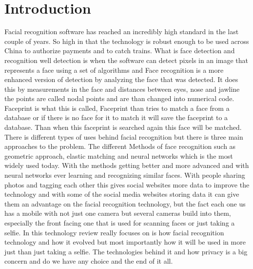 \documentclass[journal]{IEEEtran}
\begin{document}
\section{Introduction}
Facial recognition software has reached an incredibly high standard in the last couple of years. So high in that the technology is robust enough to be used across China to authorize payments and to catch trains.
What is face detection and recognition well detection is when the software can detect pixels in an image that represents a face using a set of algorithms and Face recognition is a more enhanced version of detection by analyzing the face that was detected. It does this by measurements in the face and distances between eyes, nose and jawline the points are called nodal points and are than changed into numerical code. Faceprint is what this is called, Faceprint than tries to match a face from a database or if there is no face for it to match it will save the faceprint to a database. Than when this faceprint is searched again this face will be matched. There is different types of uses behind facial recognition but there is three main approaches to the problem. The different Methods of face recognition such as geometric approach, elastic matching and neural networks which is the most widely used today. \cite{methods}
With the methods getting better and more advanced and with neural networks ever learning and recognizing similar faces. With people sharing photos and tagging each other this gives social websites more data to improve the technology and with some of the social media websites storing data it can give them an advantage on the facial recognition technology, but the fact each one us has a mobile with not just one camera but several cameras build into them, especially the front facing one that is used for scanning faces or just taking a selfie.
In this technology review really focuses on is how facial recognition technology and how it evolved but most importantly how it will be used in more just than just taking a selfie. The technologies behind it and how privacy is a big concern and do we have any choice and the end of it all. 
\end{document}
